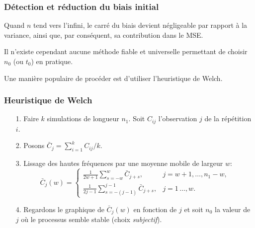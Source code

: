 \documentclass[t,usepdftitle=false]{beamer}
\begin{document}
\begin{frame}
\frametitle{Détection et réduction du biais initial}

Quand $n$ tend vers l'infini, le carré du biais devient négligeable
par rapport à la variance, ainsi que, par conséquent, sa contribution
dans le MSE.

\mbox{}

Il n'existe cependant aucune méthode fiable et universelle permettant
de choisir $n_0$ (ou $t_0$) en pratique.

\mbox{}

Une manière populaire de procéder est d'utiliser l'heuristique de
Welch.

\end{frame}

\begin{frame}
\frametitle{Heuristique de Welch}

\begin{enumerate}
\item[1.]
 Faire ${k}$ simulations de longueur ${n_1}$. Soit
 ${C_{ij}}$ l'observation $j$ de la répétition $i$.
\item[2.]
 Posons ${\bar C_j} = \sum_{i=1}^k C_{ij}/k$.
\item[3.] 
 Lissage des hautes fréquences par une moyenne mobile de largeur ${w}$: 
$$
  {\bar C_j(w)} = 
  \begin{cases}
    \frac{1}{2w+1} \sum_{s=-w}^w \bar C_{j+s}, & j=w+1,\dots,n_1-w, \\
    \frac{1}{2j-1} \sum_{s=-(j-1)}^{j-1} \bar C_{j+s}, & j=1\,\ldots,w.
  \end{cases}
$$
\item[4.] 
  Regardons le graphique de $\bar C_j(w)$ en fonction de $j$ et soit 
  ${n_0}$ la valeur de $j$ où le processus semble stable
  (choix \emph{subjectif}).
\end{enumerate}

\end{frame}
\end{document}
